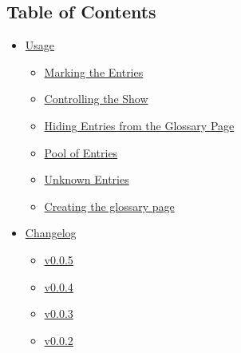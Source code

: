 \subsection{Table of Contents}\label{table-of-contents}

\begin{itemize}
\tightlist
\item
  \href{https://github.com/typst/packages/raw/main/packages/preview/gloss-awe/0.0.5/\#usage}{Usage}

  \begin{itemize}
  \tightlist
  \item
    \href{https://github.com/typst/packages/raw/main/packages/preview/gloss-awe/0.0.5/\#marking-the-entries}{Marking
    the Entries}
  \item
    \href{https://github.com/typst/packages/raw/main/packages/preview/gloss-awe/0.0.5/\#controlling-the-show}{Controlling
    the Show}
  \item
    \href{https://github.com/typst/packages/raw/main/packages/preview/gloss-awe/0.0.5/\#hiding-entries-from-the-glossary-page}{Hiding
    Entries from the Glossary Page}
  \item
    \href{https://github.com/typst/packages/raw/main/packages/preview/gloss-awe/0.0.5/\#pool-of-entries}{Pool
    of Entries}
  \item
    \href{https://github.com/typst/packages/raw/main/packages/preview/gloss-awe/0.0.5/\#unknown-entries}{Unknown
    Entries}
  \item
    \href{https://github.com/typst/packages/raw/main/packages/preview/gloss-awe/0.0.5/\#creating-the-glossary-page}{Creating
    the glossary page}
  \end{itemize}
\item
  \href{https://github.com/typst/packages/raw/main/packages/preview/gloss-awe/0.0.5/\#changelog}{Changelog}

  \begin{itemize}
  \tightlist
  \item
    \href{https://github.com/typst/packages/raw/main/packages/preview/gloss-awe/0.0.5/\#v005}{v0.0.5}
  \item
    \href{https://github.com/typst/packages/raw/main/packages/preview/gloss-awe/0.0.5/\#v004}{v0.0.4}
  \item
    \href{https://github.com/typst/packages/raw/main/packages/preview/gloss-awe/0.0.5/\#v003}{v0.0.3}
  \item
    \href{https://github.com/typst/packages/raw/main/packages/preview/gloss-awe/0.0.5/\#v002}{v0.0.2}
  \end{itemize}
\end{itemize}

